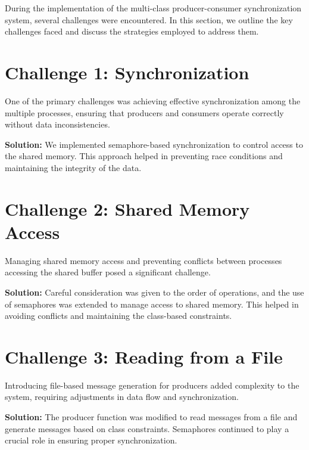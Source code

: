 During the implementation of the multi-class producer-consumer synchronization system, several challenges were encountered. In this section, we outline the key challenges faced and discuss the strategies employed to address them.

\section{Challenge 1: Synchronization}

One of the primary challenges was achieving effective synchronization among the multiple processes, ensuring that producers and consumers operate correctly without data inconsistencies.

\textbf{Solution:} We implemented semaphore-based synchronization to control access to the shared memory. This approach helped in preventing race conditions and maintaining the integrity of the data.

\section{Challenge 2: Shared Memory Access}

Managing shared memory access and preventing conflicts between processes accessing the shared buffer posed a significant challenge.

\textbf{Solution:} Careful consideration was given to the order of operations, and the use of semaphores was extended to manage access to shared memory. This helped in avoiding conflicts and maintaining the class-based constraints.

\section{Challenge 3: Reading from a File}

Introducing file-based message generation for producers added complexity to the system, requiring adjustments in data flow and synchronization.

\textbf{Solution:} The producer function was modified to read messages from a file and generate messages based on class constraints. Semaphores continued to play a crucial role in ensuring proper synchronization.